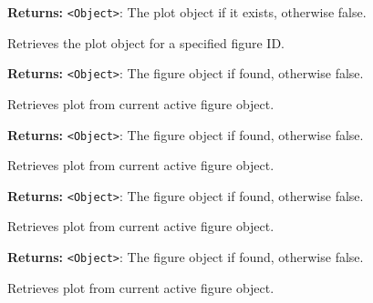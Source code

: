 \documentclass[12pt,a4paper]{article}
\begin{document}
\noindent \textbf{Returns:} \texttt{<Object>}: The plot object if it exists, otherwise \textasciigrave{}false\textasciigrave{}.

\noindent Retrieves the plot object for a specified figure ID.

\vspace{5mm}
\noindent {}


\noindent \textbf{Returns:} \texttt{<Object>}: The figure object if found, otherwise \textasciigrave{}false\textasciigrave{}.

\noindent Retrieves plot from current active figure object.

\vspace{5mm}
\noindent {}


\noindent \textbf{Returns:} \texttt{<Object>}: The figure object if found, otherwise \textasciigrave{}false\textasciigrave{}.

\noindent Retrieves plot from current active figure object.

\vspace{5mm}
\noindent {}


\noindent \textbf{Returns:} \texttt{<Object>}: The figure object if found, otherwise \textasciigrave{}false\textasciigrave{}.

\noindent Retrieves plot from current active figure object.

\vspace{5mm}
\noindent {}


\noindent \textbf{Returns:} \texttt{<Object>}: The figure object if found, otherwise \textasciigrave{}false\textasciigrave{}.

\noindent Retrieves plot from current active figure object.

\vspace{5mm}
\noindent {}
\end{document}
